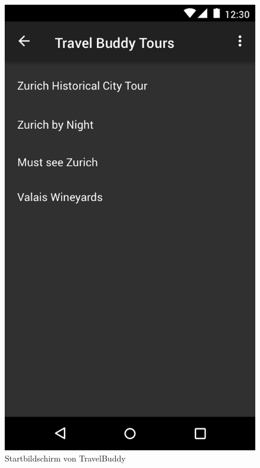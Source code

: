 \documentclass[a4paper,10pt,xetex]{article}
\begin{document}
\begin{figure}
  \centering
  \begin{minipage}[b]{0.48\textwidth}
    \includegraphics[width=\textwidth]{ListActivity}
    \caption{Startbildschirm von TravelBuddy}
  \end{minipage}
  \hfill
  \begin{minipage}[b]{0.48\textwidth}

\end{minipage}
\end{figure}
\end{document}
